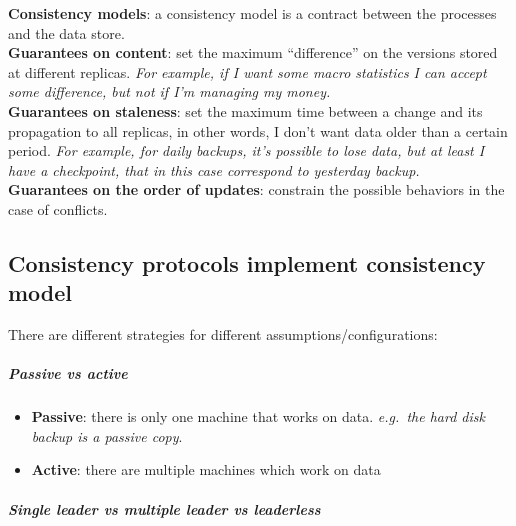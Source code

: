 \textbf{Consistency models}: a consistency model is a contract between
the processes and the data store.\\
\textbf{Guarantees on content}: set the maximum ``difference'' on the
versions stored at different replicas. \emph{For example, if I want some
macro statistics I can accept some difference, but not if I'm managing
my money.}\\
\textbf{Guarantees on staleness}: set the maximum time between a change
and its propagation to all replicas, in other words, I don't want data
older than a certain period. \emph{For example, for daily backups, it's
possible to lose data, but at least I have a checkpoint, that in this
case correspond to yesterday backup.}\\
\textbf{Guarantees on the order of updates}: constrain the possible
behaviors in the case of conflicts.

\subsection{Consistency protocols implement consistency model}

There are different strategies for different assumptions/configurations:

\subparagraph{Passive vs active}

\begin{itemize}
    \item
      \textbf{Passive}: there is only one machine that works on data.
      \emph{e.g.~the hard disk backup is a passive copy}.
    \item
      \textbf{Active}: there are multiple machines which work on data
\end{itemize}

\subparagraph{Single leader vs multiple leader vs leaderless}

